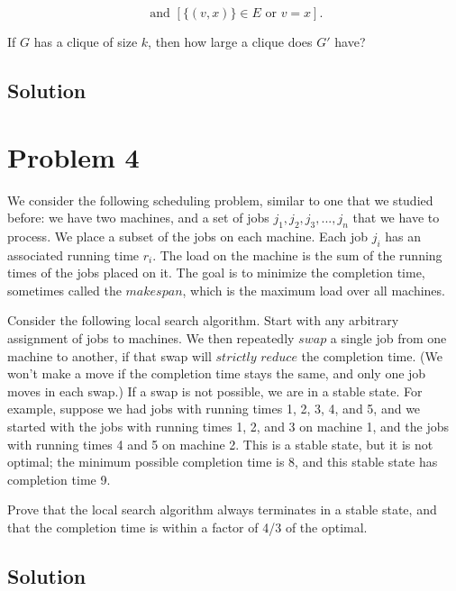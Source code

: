 \documentclass[11pt]{article}
\begin{document}
\begin{equation}
[\{(u,w)\}\in E \text{ or } u=w] \text{ and } [\{(v,x)\}\in E \text{ or } v=x].			
\end{equation}

If $G$ has a clique of size $k$, then how large a clique does $G′$ have?

\subsection{Solution}

\section{Problem 4}

We consider the following scheduling problem, similar to one that we studied before: we have two machines, and a set of jobs $j_1, j_2, j_3,..., j_n$ that we have to process. We place a subset of the jobs on each machine. Each job $j_i$ has an associated running time $r_i$. The load on the machine is the sum of the running times of the jobs placed on it. The goal is to minimize the completion time, sometimes called the $makespan$, which is the maximum load over all machines.

Consider the following local search algorithm. Start with any arbitrary assignment of jobs to machines. We then repeatedly $swap$ a single job from one machine to another, if that swap will $strictly$ $reduce$ the completion time. (We won’t make a move if the completion time stays the same, and only one job moves in each swap.) If a swap is not possible, we are in a stable state. For example, suppose we had jobs with running times 1, 2, 3, 4, and 5, and we started with the jobs with running times 1, 2, and 3 on machine 1, and the jobs with running times 4 and 5 on machine 2. This is a stable state, but it is not optimal; the minimum possible completion time is 8, and this stable state has completion time 9.

Prove that the local search algorithm always terminates in a stable state, and that the completion time is within a factor of 4/3 of the optimal.

\subsection{Solution}
\end{document}
